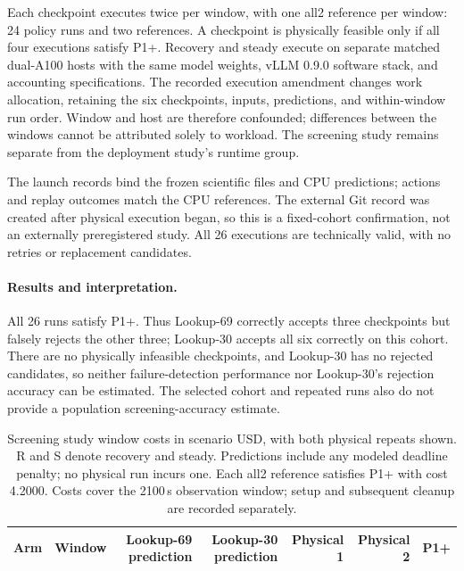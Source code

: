 Each checkpoint executes twice per window, with one all2 reference per
window: 24 policy runs and two references. A checkpoint is physically
feasible only if all four executions satisfy P1+. Recovery and steady
execute on separate matched dual-A100 hosts with the same model weights,
vLLM 0.9.0 software stack, and accounting specifications. The recorded
execution amendment changes work allocation, retaining the six checkpoints,
inputs, predictions, and within-window run order. Window and host are
therefore confounded; differences between the windows cannot be attributed
solely to workload. The screening study remains separate from the deployment study's runtime group.

The launch records bind the frozen scientific files and CPU predictions;
actions and replay outcomes match the CPU references. The external Git
record was created after physical execution began, so this is a fixed-cohort
confirmation, not an externally preregistered study. All 26 executions are
technically valid, with no retries or replacement candidates.

\paragraph{Results and interpretation.}
All 26 runs satisfy P1+. Thus Lookup-69 correctly accepts three checkpoints but
falsely rejects the other three; Lookup-30 accepts all six correctly on this
cohort. There are no physically infeasible checkpoints, and Lookup-30 has no
rejected candidates, so neither failure-detection performance nor Lookup-30's
rejection accuracy can be estimated. The selected cohort and repeated runs
also do not provide a population screening-accuracy estimate.

\begin{table}[t]
\centering
\small
\caption{Screening study window costs in scenario USD, with both physical repeats shown.
R and S denote recovery and steady. Predictions include any modeled deadline
penalty; no physical run incurs one. Each all2 reference satisfies P1+ with
cost 4.2000. Costs cover the 2100\,s observation window; setup and subsequent
cleanup are recorded separately.}
\label{tab:e3costs}
\setlength{\tabcolsep}{4pt}
\par\vspace{4pt}
\begin{tabular*}{0.94\linewidth}{@{\extracolsep{\fill}}llrrrrr@{}}
\toprule
Arm & Window & Lookup-69 prediction & Lookup-30 prediction & Physical 1 & Physical 2 & P1+\\
\midrule

\end{tabular*}
\end{table}

